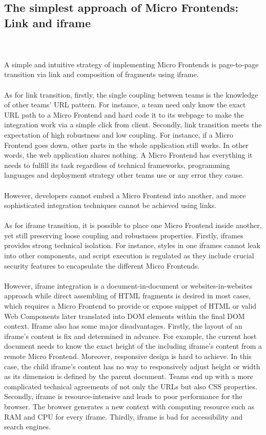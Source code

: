 \documentclass[a4paper]{book}
\begin{document}
\subsection{The simplest approach of Micro Frontends: Link and iframe}
\\ \\ 
A simple and intuitive strategy of implementing Micro Frontends is page-to-page transition via link and composition of fragments using iframe.
\\ \\
As for link transition, firstly, the single coupling between teams is the knowledge of other teams’ URL pattern. For instance, a team need only know the exact URL path to a Micro Frontend and hard code it to its webpage to make the integration work via a simple click from client. Secondly, link transition meets the expectation of high robustness and low coupling. For instance, if a Micro Frontend goes down, other parts in the whole application still works. In other words, the web application shares nothing. A Micro Frontend has everything it needs to fulfill its task regardless of technical frameworks, programming languages and deployment strategy other teams use or any error they cause.
\\ \\
However, developers cannot embed a Micro Frontend into another, and more sophisticated integration techniques cannot be achieved using links. 
\\ \\
As for iframe transition, it is possible to place one Micro Frontend inside another, yet still preserving loose coupling and robustness properties. Firstly, iframes provides strong technical isolation. For instance, styles in one iframes cannot leak into other components, and script execution is regulated as they include crucial security features to encapsulate the different Micro Frontends.
\\ \\
However, iframe integration is a document-in-document or websites-in-websites approach while direct assembling of HTML fragments is desired in most cases, which requires a Micro Frontend to provide or expose snippet of HTML or valid Web Components later translated into DOM elements within the final DOM context. Iframe also has some major        disadvantages. Firstly, the layout of an iframe’s content is fix and determined in advance. For example, the current host document needs to know the exact height of the including iframe’s content from a remote Micro Frontend. Moreover, responsive design is hard to achieve. In this case, the child iframe’s content has no way to responsively adjust height or width as its dimension is defined by the parent document. Teams end up with a more complicated technical agreements of not only the URLs but also CSS properties. Secondly, iframe is resource-intensive and leads to poor performance for the browser. The browser generates a new context with computing resource such as RAM and CPU for every iframe. Thirdly, iframe is bad for accessibility and search engines.
\end{document}
